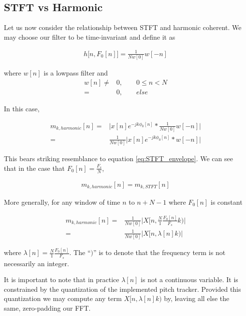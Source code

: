 \documentclass [11pt, proquest,oneside] {ganter_thesis}[2015/03/03]
\begin{document}
\subsection{STFT vs Harmonic}

Let us now consider the relationship between STFT and harmonic coherent.  We may choose our filter to be time-invariant and define it as

\begin{align}
h\big[n, F_0[n] \big] = \frac{1}{Nw[0]} w[-n]
\end{align}

where $w[n]$ is a lowpass filter and 
\begin{align}
w[n] \neq& 0, \qquad 0 \leq n < N \nonumber \\
=& 0, \qquad else
\end{align}

In this case,

\begin{align}
m_{k,harmonic}[n] =& \Big| x[n] e^{-jk\phi_0 [n]} *  \frac{1}{Nw[0]} w[-n] \Big|  \nonumber \\
=& \frac{1}{Nw[0]} \Big| x[n] e^{-jk\phi_0 [n]} *  w[-n] \Big|
\end{align}

This bears striking resemblance to equation \ref{eq:STFT_envelope}.  We can see that in the case that $F_0[n] = \frac{F_s}{N}$,

\begin{align}
m_{k,harmonic}[n] = m_{k,STFT}[n]
\end{align}

More generally, for any window of time $n$ to $n + N - 1$ where $F_0[n]$ is constant

\begin{align}
m_{k,harmonic}[n] =& \frac{1}{Nw[0]} \Bigg| X\Big[n, \frac{N}{1} \frac{F_0[n]}{F_s} k \Big) \Bigg| \nonumber \\
\label{eq:harmonic-to-stft}
=& \frac{1}{Nw[0]} \Bigg| X\Big[n, \lambda[n]k\Big) \Bigg|
\end{align}

where $\lambda[n] = \frac{N}{1} \frac{F_0[n]}{F_s}$.  The ``$)$'' is to denote that the frequency term is not necessarily an integer.

It is important to note that in practice $\lambda[n]$ is not a continuous variable.  It is constrained by the quantization of the implemented pitch tracker.  Provided this quantization we may compute any term $X[n, \lambda[n]k)$ by, leaving all else the same, zero-padding our FFT.
\end{document}
